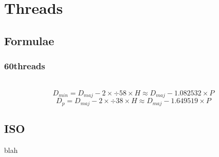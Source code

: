 \chapter{Threads}
\section{Formulae}\label{thread_formulae}
\subsection{60\degree threads}
$$ $$\\
$$D_{min} = D_{maj} - 2 \times \div{5}{8} \times H \approx D_{maj} - 1.082532 \times P $$ 
$$D_{p} = D_{maj} - 2 \times \div{3}{8} \times H \approx D_{maj} - 1.649519 \times P $$


\section{ISO}
blah
\\ \\ \\ \\ \\ \\ \\ \\ \\ \\ \\ \\ \\ \\ \\ \\ \\ \\               

